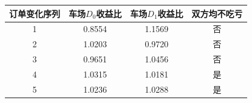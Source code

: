 \begin{tabular}{cccc}
\toprule
订单变化序列 & 车场$D_0$收益比 & 车场$D_1$收益比 & 双方均不吃亏 \\
\midrule
1 & 0.8554 & 1.1569 & 否 \\
2 & 1.0203 & 0.9720 & 否 \\
3 & 0.9651 & 1.0456 & 否 \\
4 & 1.0315 & 1.0181 & 是 \\
5 & 1.0236 & 1.0288 & 是 \\
\bottomrule
\end{tabular}
